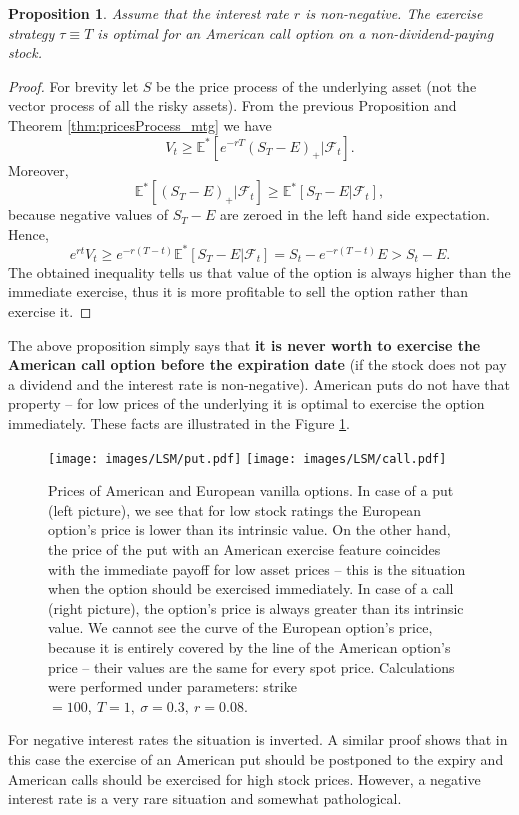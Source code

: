 \documentclass[a4paper,11pt, twoside]{book}
\newtheorem{prop}[thm]{Proposition}
\theoremstyle{definition}
\theoremstyle{remark}
\def\Em{{\mathbb{E}^*}}
\begin{document}
\begin{prop}
\label{prop:amCall}
 Assume that the interest rate $r$ is non-negative. The exercise strategy $\tau \equiv T$ is optimal for an American call option on a non-dividend-paying stock.
\end{prop}
\begin{proof}
 For brevity let $S$ be the price process of the underlying asset (not the vector process of all the risky assets). From the previous Proposition and Theorem \ref{thm:pricesProcess_mtg} we have
 \[V_t \geq \Em[e^{-rT}(S_T - E)_+ | \mathcal{F}_t].\] Moreover,
 \[\Em[(S_T - E)_+ | \mathcal{F}_t] \geq \Em[S_T - E | \mathcal{F}_t],\]
 because negative values of $S_T - E$ are zeroed in the left hand side expectation. Hence,
 \[ e^{rt} V_t \geq e^{-r(T-t)}\Em[S_T - E | \mathcal{F}_t] = S_t - e^{-r(T-t)}E > S_t - E.\]
 The obtained inequality tells us that value of the option is always higher than the immediate exercise, thus it is more profitable to sell the option rather than exercise it.
\end{proof}
The above proposition simply says that \textbf{it is never worth to exercise the American call option before the expiration date} (if the stock does not pay a dividend and the interest rate is non-negative). American puts do not have that property -- for low prices of the underlying it is optimal to exercise the option immediately. These facts are illustrated in the Figure \ref{fig:lsm:amPrice}.

\begin{figure}
\centering
 \texttt{[image: images/LSM/put.pdf]}
 \texttt{[image: images/LSM/call.pdf]}
\caption{Prices of American and European vanilla options. In case of a put (left picture), we see that for low stock ratings the European option's price is lower than its intrinsic value. On the other hand, the price of the put with an American exercise feature coincides with the immediate payoff for low asset prices -- this is the situation when the option should be exercised immediately. In case of a call (right picture), the option's price is always greater than its intrinsic value. We cannot see the curve of the European option's price, because it is entirely covered by the line of the American option's price -- their values are the same for every spot price. Calculations were performed under parameters: strike~$=100,\ T=1,\ \sigma=0.3,\ r=0.08$.}
\label{fig:lsm:amPrice}
\end{figure}

For negative interest rates the situation is inverted. A similar proof shows that in this case the exercise of an American put should be postponed to the expiry and American calls should be exercised for high stock prices. However, a negative interest rate is a very rare situation and somewhat pathological.
\end{document}
